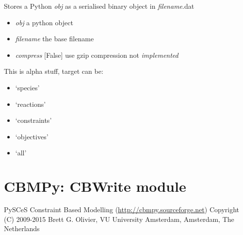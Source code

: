 \documentclass[a4paper,11pt,english]{sphinxmanual}
\begin{document}
\begin{fulllineitems}
\label{modules_doc:cbmpy.CBTools.storeObj}
Stores a Python \emph{obj} as a serialised binary object in \emph{filename}.dat
\begin{itemize}
\item {} 
\emph{obj} a python object

\item {} 
\emph{filename} the base filename

\item {} 
\emph{compress} {[}False{]} use gzip compression not \emph{implemented}

\end{itemize}

\end{fulllineitems}


\begin{fulllineitems}
\label{modules_doc:cbmpy.CBTools.stringReplace}
This is alpha stuff, target can be:
\begin{itemize}
\item {} 
`species'

\item {} 
`reactions'

\item {} 
`constraints'

\item {} 
`objectives'

\item {} 
`all'

\end{itemize}

\end{fulllineitems}

\label{modules_doc:module-cbmpy.CBWrite}

\section{CBMPy: CBWrite module}
\label{modules_doc:cbmpy-cbwrite-module}
PySCeS Constraint Based Modelling (\href{http://cbmpy.sourceforge.net}{http://cbmpy.sourceforge.net})
Copyright (C) 2009-2015 Brett G. Olivier, VU University Amsterdam, Amsterdam, The Netherlands
\end{document}
